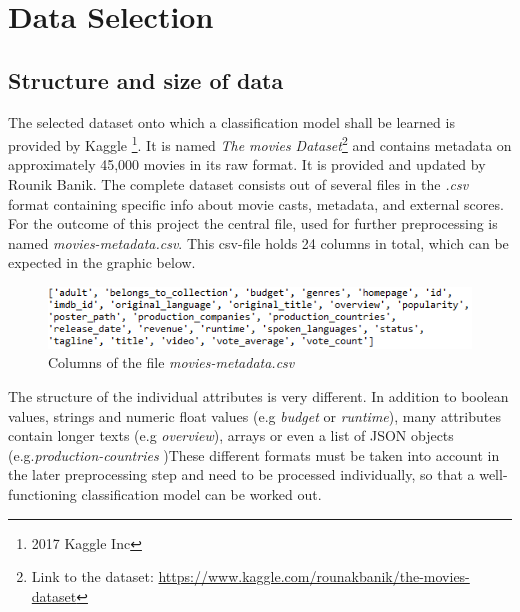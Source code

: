 \chapter{Data Selection}
\label{cha:data_selection}

\section{Structure and size of data}
The selected dataset onto which a classification model shall be learned is provided by Kaggle \footnote{2017 Kaggle Inc}. It is named \textit{The movies Dataset}\footnote{Link to the dataset: \hyperref[https://www.kaggle.com/rounakbanik/the-movies-dataset]{https://www.kaggle.com/rounakbanik/the-movies-dataset}} and contains metadata on approximately 45,000 movies in its raw format. It is provided and updated by Rounik Banik. The complete dataset consists out of several files in the \textit{.csv} format containing specific info about movie casts, metadata, and external scores. For the outcome of this project the central file, used for further preprocessing is named \textit{movies-metadata.csv}. This csv-file holds 24 columns in total, which can be expected in the graphic below.
\begin{figure}[ht]
    \centering
        \includegraphics[width=\textwidth]{images/Raw_dataset_headers.png}
    \caption{Columns of the file \textit{movies-metadata.csv}}
\end{figure}


The structure of the individual attributes is very different. In addition to boolean values, strings and numeric float values (e.g \textit{budget} or \textit{runtime}), many attributes contain longer texts (e.g \textit{overview}), arrays or even a list of JSON objects (e.g.\textit{production-countries} )These different formats must be taken into account in the later preprocessing step and need to be processed individually, so that a well-functioning classification model can be worked out.


